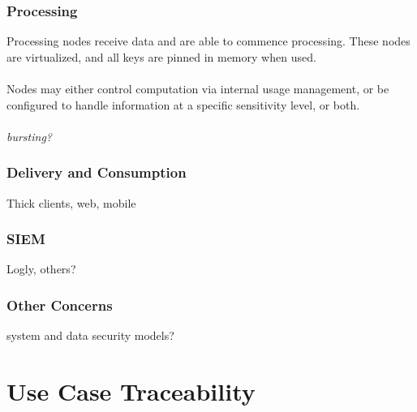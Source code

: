 \documentclass[t,handout]{beamer}
\begin{document}
\begin{frame}
\frametitle{Processing}
Processing nodes receive data and are able to commence processing.  These nodes are virtualized, and all keys are pinned in memory when used.  \\~\\

Nodes may either control computation via internal usage management, or be configured to handle information at a specific sensitivity level, or both. \\~\\

{\sl bursting?}
\end{frame}

\begin{frame}
\frametitle{Delivery and Consumption}
Thick clients, web, mobile
\end{frame}

\begin{frame}
\frametitle{SIEM}
Logly, others?
\end{frame}

\begin{frame}
\frametitle{Other Concerns}
system and data security models?
\end{frame}

\section{Use Case Traceability}

\end{document}
